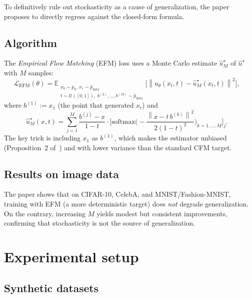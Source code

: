 \documentclass[10pt,a4paper]{article}
\theoremstyle{definition}
\newcommand{\E}{\mathbb{E}}
\newcommand{\cL}{\mathcal{L}}
\newcommand{\norm}[1]{\left\lVert #1 \right\rVert}
\begin{document}
To definitively rule out stochasticity as a cause of generalization, the paper proposes to directly regress against the closed-form formula.

\subsection{Algorithm}

The \emph{Empirical Flow Matching} (EFM) loss uses a Monte Carlo estimate $\hat{u}^\star_M$ of $\hat{u}^\star$ with $M$ samples:
\begin{equation}\label{eq:efm-loss}
    \cL_{\mathrm{EFM}}(\theta) = \E_{\substack{x_0\sim p_0,\, x_1\sim\hat{p}_{\mathrm{data}} \\ t\sim\mathcal{U}([0,1]),\; b^{(2)},\ldots,b^{(M)}\sim\hat{p}_{\mathrm{data}}}}\!\Big[\norm{u_\theta(x_t, t) - \hat{u}^\star_M(x_t, t)}^2\Big],
\end{equation}
where $b^{(1)} := x_1$ (the point that generated $x_t$) and
\[
    \hat{u}^\star_M(x, t) = \sum_{j=1}^M \frac{b^{(j)} - x}{1-t} \cdot \Big[\mathrm{softmax}\Big(-\frac{\norm{x - t\,b^{(k)}}^2}{2(1-t)^2}\Big)_{k=1,\ldots,M}\Big]_j.
\]
The key trick is including $x_1$ as $b^{(1)}$, which makes the estimator unbiased (Proposition~2 of~\cite{bertrand2025closed}) and with lower variance than the standard CFM target.

\subsection{Results on image data}

The paper shows that on CIFAR-10, CelebA, and MNIST/Fashion-MNIST, training with EFM (a more deterministic target) does \emph{not} degrade generalization.
On the contrary, increasing $M$ yields modest but consistent improvements, confirming that stochasticity is not the source of generalization.


\section{Experimental setup}\label{sec:setup}

\subsection{Synthetic datasets}
\end{document}
